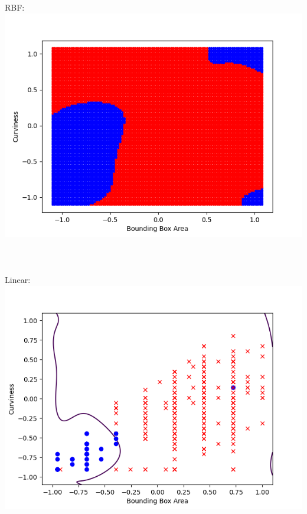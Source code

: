 \documentclass{article}
\begin{document}
		RBF:\\
		\includegraphics[scale=0.8]{../hw11/2b}\\\\\\\\
		Linear:\\
		\includegraphics[scale=0.8]{../hw09/3}
\end{document}
